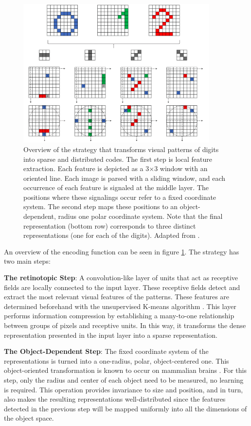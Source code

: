\documentclass{article}
\begin{document}
\begin{figure}[h]
    \centering
    \includegraphics[width=0.9\textwidth]{img/sacouto1.png}
    \caption{Overview of the strategy that transforms visual patterns of digits into sparse and distributed codes. The first step is local feature extraction. Each feature is depicted as a 3×3 window with an oriented line. Each image is parsed with a sliding window, and each occurrence of each feature is signaled at the middle layer. The positions where these signalings occur refer to a fixed coordinate system. The second step maps these positions to an object-dependent, radius one polar coordinate system. Note that the final representation (bottom row) corresponds to three distinct representations (one for each of the digits). Adapted from \cite{sa2020storing}.}
\label{fig:sacouto1}
\end{figure}

An overview of the encoding function can be seen in figure \ref{fig:sacouto1}. The strategy has two main steps:

\textbf{The retinotopic Step}: A convolution-like layer \cite{lecun1995convolutional} of units that act as receptive fields are locally connected to the input layer. These receptive fields detect and extract the most relevant visual features of the patterns. These features are determined beforehand with the unsupervised K-means algorithm \cite{lloyd1982least, wu2008top}. This layer performs information compression by establishing a many-to-one relationship between groups of pixels and receptive units. In this way, it transforms the dense representation presented in the input layer into a sparse representation.

\textbf{The Object-Dependent Step}: The fixed coordinate system of the representations is turned into a one-radius, polar, object-centered one. This object-oriented transformation is known to occur on mammalian brains \cite{chafee2007representing}. For this step, only the radius and center of each object need to be measured, no learning is required. This operation provides invariance to size and position, and in turn, also makes the resulting representations well-distributed since the features detected in the previous step will be mapped uniformly into all the dimensions of the object space. 
\end{document}
